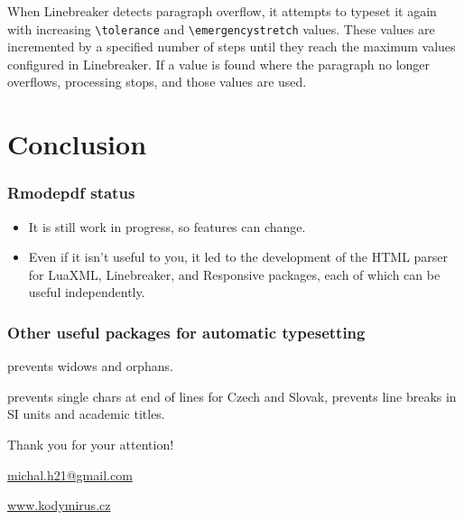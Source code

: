 When Linebreaker detects paragraph overflow, it attempts to typeset it again
with increasing \verb|\tolerance| and \verb|\emergencystretch| values. These values are
incremented by a specified number of steps until they reach the maximum values
configured in Linebreaker. If a value is found where the paragraph no longer
overflows, processing stops, and those values are used.

\section{Conclusion}


\begin{frame}[fragile]
  \frametitle{Rmodepdf status}

  \begin{itemize}
    \item It is still work in progress, so features can change.
    \item Even if it isn't useful to you, it led to the development of the HTML parser for LuaXML, Linebreaker, and Responsive packages, each of which can be useful independently.
  \end{itemize}

\end{frame}

\begin{frame}[fragile]
  \frametitle{Other useful packages for automatic typesetting}
  \begin{description}
    \item[lua-widow-control] prevents widows and orphans.
    \item[luavlna]  prevents single chars at end of lines for Czech and Slovak, prevents line breaks in SI units and academic titles.
  \end{description}
\end{frame}





\begin{frame}[standout]
  Thank you for your attention!

  \url{michal.h21@gmail.com}

  \url{www.kodymirus.cz}
\end{frame}


